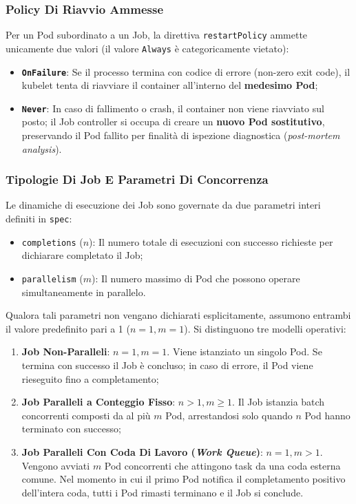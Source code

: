 \documentclass[11pt, a4paper]{article}
\begin{document}
\subsubsection{Policy Di Riavvio Ammesse}
Per un Pod subordinato a un Job, la direttiva \texttt{restartPolicy} ammette unicamente due valori (il valore \texttt{Always} è categoricamente vietato):
\begin{itemize}[noitemsep]
    \item \textbf{\texttt{OnFailure}}: Se il processo termina con codice di errore (non-zero exit code), il kubelet tenta di riavviare il container all'interno del \textbf{medesimo Pod};
    \item \textbf{\texttt{Never}}: In caso di fallimento o crash, il container non viene riavviato sul posto; il Job controller si occupa di creare un \textbf{nuovo Pod sostitutivo}, preservando il Pod fallito per finalità di ispezione diagnostica (\emph{post-mortem analysis}).
\end{itemize}

\subsubsection{Tipologie Di Job E Parametri Di Concorrenza}
Le dinamiche di esecuzione dei Job sono governate da due parametri interi definiti in \texttt{spec}:
\begin{itemize}[noitemsep]
    \item \texttt{completions} ($n$): Il numero totale di esecuzioni con successo richieste per dichiarare completato il Job;
    \item \texttt{parallelism} ($m$): Il numero massimo di Pod che possono operare simultaneamente in parallelo.
\end{itemize}

Qualora tali parametri non vengano dichiarati esplicitamente, assumono entrambi il valore predefinito pari a 1 ($n=1, m=1$). Si distinguono tre modelli operativi:
\begin{enumerate}[noitemsep]
    \item \textbf{Job Non-Paralleli}: $n=1, m=1$. Viene istanziato un singolo Pod. Se termina con successo il Job è concluso; in caso di errore, il Pod viene rieseguito fino a completamento;
    \item \textbf{Job Paralleli a Conteggio Fisso}: $n > 1, m \ge 1$. Il Job istanzia batch concorrenti composti da al più $m$ Pod, arrestandosi solo quando $n$ Pod hanno terminato con successo;
    \item \textbf{Job Paralleli Con Coda Di Lavoro (\emph{Work Queue})}: $n=1, m > 1$. Vengono avviati $m$ Pod concorrenti che attingono task da una coda esterna comune. Nel momento in cui il primo Pod notifica il completamento positivo dell'intera coda, tutti i Pod rimasti terminano e il Job si conclude.
\end{enumerate}
\end{document}
